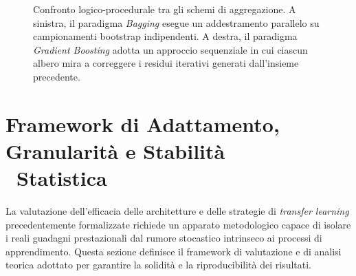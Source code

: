 \begin{figure}[H]
    \caption{Confronto logico-procedurale tra gli schemi di aggregazione. A sinistra, il paradigma \textit{Bagging} esegue un addestramento parallelo su campionamenti bootstrap indipendenti. A destra, il paradigma \textit{Gradient Boosting} adotta un approccio sequenziale in cui ciascun albero mira a correggere i residui iterativi generati dall'insieme precedente.}
    \label{fig:bagging_vs_boosting}
\end{figure}

\section[Framework di Adattamento, Granularità e Stabilità Statistica]{Framework di Adattamento, Granularità e Stabilità \\\ Statistica}
\label{sec:framework_adattamento}

La valutazione dell'efficacia delle architetture e delle strategie di \textit{transfer learning} precedentemente formalizzate richiede un apparato metodologico capace di isolare i reali guadagni prestazionali dal rumore stocastico intrinseco ai processi di apprendimento. 
Questa sezione definisce il framework di valutazione e di analisi teorica adottato per garantire la solidità e la riproducibilità dei risultati.

